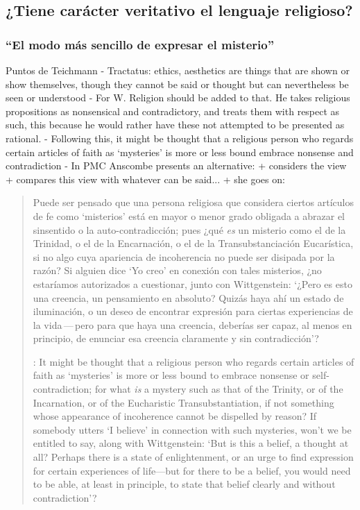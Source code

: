 \subsection{¿Tiene carácter veritativo el lenguaje religioso?}

\subsubsection{``El modo más sencillo de expresar el misterio''}

Puntos de Teichmann
- Tractatus: ethics, aesthetics are things that are shown or show themselves, though they cannot be said or thought but can nevertheless be seen or understood
- For W. Religion should be added to that. He takes religious propositions as nonsensical and contradictory, and treats them with respect as such, this because he would rather have these not attempted to be presented as rational.
- Following this, it might be thought that a religious person who regards certain articles of faith as `mysteries' is more or less bound embrace nonsense and contradiction
- In PMC Anscombe presents an alternative:
  + considers the view
  + compares this view with whatever can be said...
  + she goes on:


  \blockquote[{\cite[211]{teichmann2008ans}}: It might be thought that a religious person who regards certain articles of faith as `mysteries' is more or less bound to embrace nonsense or self-contradiction; for what \emph{is} a mystery such as that of the Trinity, or of the Incarnation, or of the Eucharistic Transubstantiation, if not something whose appearance of incoherence cannot be dispelled by reason? If somebody utters `I believe' in connection with such mysteries, won't we be entitled to say, along with Wittgenstein: `But is this a belief, a thought at all? Perhaps there is a state of enlightenment, or an urge to find expression for certain experiences of life---but for there to be a belief, you would need to be able, at least in principle, to state that belief clearly and without contradiction'?]{Puede ser pensado que una persona religiosa que considera ciertos artículos de fe como `misterios' está en mayor o menor grado obligada a abrazar el sinsentido o la auto-contradicción; pues ¿qué \emph{es} un misterio como el de la Trinidad, o el de la Encarnación, o el de la Transubstanciación Eucarística, si no algo cuya apariencia de incoherencia no puede ser disipada por la razón? Si alguien dice `Yo creo' en conexión con tales misterios, ¿no estaríamos autorizados a cuestionar, junto con Wittgenstein: `¿Pero es esto una creencia, un pensamiento en absoluto? Quizás haya ahí un estado de iluminación, o un deseo de encontrar expresión para ciertas experiencias de la vida\,---\,pero para que haya una creencia, deberías ser capaz, al menos en principio, de enunciar esa creencia claramente y sin contradicción'?}

